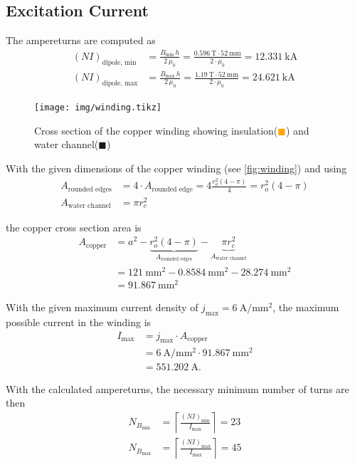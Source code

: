 \documentclass[10pt,a4paper,noendnumber=true]{scrartcl}
\begin{document}
\subsection{Excitation Current}
The ampereturns are computed as
\begin{align}
    (NI)_\text{dipole, min} &= \frac{B_\text{min}\,h}{2\,\mu_0} = \frac{\SI{0.596}{\tesla} \cdot \SI{52}{\mm}}{2\cdot \mu_0} = \SI{12.331}{\kilo\ampere}\\
    (NI)_\text{dipole, max} &= \frac{B_\text{max}\,h}{2\,\mu_0} = \frac{\SI{1.19}{\tesla} \cdot \SI{52}{\mm}}{2\cdot \mu_0} = \SI{24.621}{\kilo\ampere}
\end{align}

\begin{figure}[H]
\centering
\texttt{[image: img/winding.tikz]}
\caption{Cross section of the copper winding showing  insulation(\textcolor{orange}{$\blacksquare$}) and water channel(\textcolor{blue!20}{$\blacksquare$})}
\label{fig:winding}
\end{figure}

With the given dimensions of the copper winding (see \autoref{fig:winding}) and using 
\begin{align}
A_\text{rounded edges} &= 4 \cdot  A_\text{rounded edge} = 4 \frac{r_o^2 (4-\pi)}{4} = r_o^2(4-\pi) \\
A_\text{water channel} &= \pi r_c^2
\end{align}

the copper cross section area is
\begin{align}
	A_\text{copper} & = a^2 - \underbrace{r_o^2(4-\pi)}_{A_\text{rounded edges}} - \underbrace{\pi r_c^2}_{A_\text{water channel}} \\
	  & = \SI{121}{\mm\squared} - \SI{0.8584}{\mm\squared} - \SI{28.274}{\mm\squared} \nonumber                      \\
	  & = \SI{91.867}{\mm\squared} \nonumber
\end{align}

With the given maximum current density of $j_\text{max}=\SI{6}{\ampere\per\mm\squared}$, the maximum possible current in the winding is
\begin{align}
I_\text{max} &= j_\text{max} \cdot A_\text{copper} \\
 &=\SI{6}{\ampere\per\mm\squared} \cdot \SI{91.867}{\mm\squared} \nonumber\\ 
 &= \SI{551.202}{\ampere}. \nonumber
\end{align}

With the calculated ampereturns, the necessary minimum number of turns are then
\begin{align}
    N_{B_\text{min}} &= \left\lceil\frac{(NI)_\text{min}}{I_\text{max}}\right\rceil = 23\\
    N_{B_\text{max}} &= \left\lceil\frac{(NI)_\text{max}}{I_\text{max}}\right\rceil = 45
\end{align}
\end{document}

